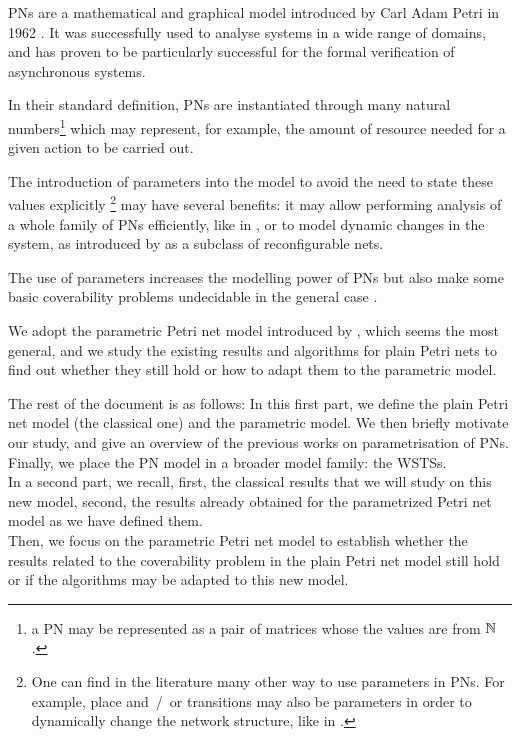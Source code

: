 \acp{PN} are a mathematical and graphical model introduced by Carl Adam Petri in 1962 \citep{Petri62,Petri66}.
It was successfully used to analyse systems in a wide range of domains, and has proven to be particularly successful for the formal verification of asynchronous systems.

In their standard definition, \acp{PN} are instantiated through many natural numbers\footnote{\ie a \ac{PN} may be represented as a pair of matrices whose the values are from $\mathbb{N}$.} which may represent, for example, the amount of resource needed for a given action to be carried out.

The introduction of parameters into the model to avoid the need to state these values explicitly%
\footnote{One can find in the literature many other way to use parameters in \acp{PN}. For example, place and~/~or transitions may also be parameters in order to dynamically change the network structure, like in \cite{Christensen97}.}
may have several benefits:
it may allow performing analysis of a whole family of \acp{PN} efficiently, like in \cite{Abdulla13}, or to model dynamic changes in the system, as introduced by \cite{Badouel99} as a subclass of reconfigurable nets.

The use of parameters increases the modelling power of \acp{PN} but also make some basic coverability problems undecidable in the general case \cite{David17}.

We adopt the parametric Petri net model introduced by \cite{David17}, which seems the most general, and we study the existing results and algorithms for plain Petri nets to find out whether they still hold or how to adapt them to the parametric model.

The rest of the document is as follows:
In this first part, we define the plain Petri net model (\ie the classical one) and the parametric model.
We then briefly motivate our study,  and give an overview of the previous works on parametrisation of \acp{PN}.
Finally, we place the \ac{PN} model in a broader model family: the \acp{WSTS}.\\
In a second part, we recall, first, the classical results that we will study on this new model, second, the results already obtained for the parametrized Petri net model as we have defined them.\\
Then, we focus on the parametric Petri net model to establish whether the results related to the coverability problem in the plain Petri net model still hold or if the algorithms may be adapted to this new model.

\acresetall

